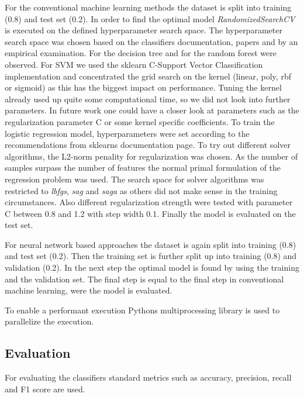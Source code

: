 For the conventional machine learning methods the dataset is split into training (0.8) and test set (0.2). In order to find the optimal model \textit{Randomized\-SearchCV} is executed on the defined hyperparameter search space. The hyperparameter search space was chosen based on the classifiers doc\-u\-men\-ta\-tion, papers and by an empirical examination. For the decision tree \cite{mantovani2019empirical} and for the random forest \cite{probstHyperparametersTuningStrategies2019} were observed. For SVM we used the sklearn C-Support Vector Classification implementation and concentrated the grid search on the kernel (linear, poly, rbf or sigmoid) as this has the biggest impact on performance. Tuning the kernel already used up quite some computational time, so we did not look into further parameters. In future work one could have a closer look at parameters such as the regularization parameter C or some kernel specific coefficients. To train the logistic regression model, hyperparameters were set according to the recommendations from sklearns documentation page. To try out different solver algorithms, the L2-norm penality for regularization was chosen. As the number of samples surpass the number of features the normal primal formulation of the regression problem was used. The search space for solver algorithms was restricted to \textit{lbfgs}, \textit{sag} and \textit{saga} as others did not make sense in the training circumstances. Also different regularization strength were tested with parameter C between 0.8 and 1.2 with step width 0.1. Finally the model is evaluated on the test set.

For neural network based approaches the dataset is again split into training (0.8) and test set (0.2). Then the training set is further split up into training (0.8) and validation (0.2). In the next step the optimal model is found by using the training and the validation set. The final step is equal to the final step in conventional machine learning, were the model is evaluated.

To enable a performant execution Pythons multiprocessing library is used to parallelize the execution.

\subsection{Evaluation}
\label{ch:approachE}

For evaluating the classifiers standard metrics such as accuracy, precision, recall and F1 score are used.

